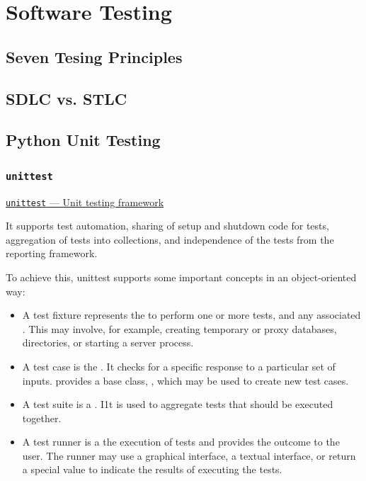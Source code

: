 \chapter{Software Testing}
\label{chap:testing}

\section{Seven Tesing Principles}

\section{SDLC vs. STLC}

\section{Python Unit Testing}

\subsection{\texttt{unittest}}
\href{https://docs.python.org/3/library/unittest.html}{\texttt{unittest} — Unit testing framework}

It supports test automation, sharing of setup and shutdown code for tests, 
aggregation of tests into collections, and independence of the tests from 
the reporting framework.

To achieve this, unittest supports some important concepts in an 
object-oriented way:

\begin{itemize}
    \item {}
    A test fixture represents the  to perform one or 
    more tests, and any associated . This may involve, 
    for example, creating temporary or proxy databases, directories, 
    or starting a server process.

    \item {}
    A test case is the . It checks for a 
    specific response to a particular set of inputs.  provides a 
    base class, , which may be used to create new test cases.

    \item {}
    A test suite is a . I1t 
    is used to aggregate tests that should be executed together.

    \item {}
    A test runner is a  the execution of 
    tests and provides the outcome to the user. The runner may use a 
    graphical interface, a textual interface, or return a special value 
    to indicate the results of executing the tests.
\end{itemize}


